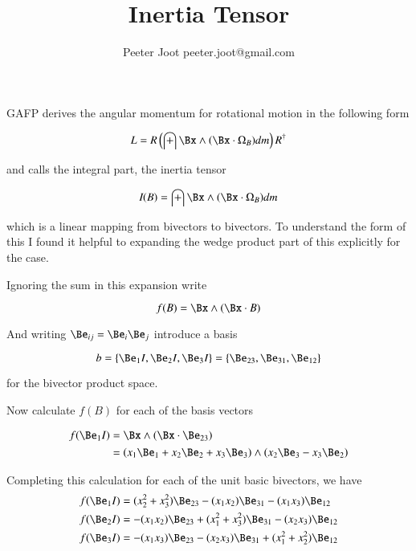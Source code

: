 \documentclass{article}      %
\title{Inertia Tensor} %
\author{Peeter Joot \quad peeter.joot@gmail.com}         %
\begin{document}

\maketitle{}

\section{}

GAFP derives the angular momentum for rotational motion in the following form

\[
L = R \left( \int \Bx \wedge (\Bx \cdot \Omega_B) dm \right) R^\dagger
\]

and calls the integral part, the inertia tensor

\[
\emph{I}(B) = \int \Bx \wedge (\Bx \cdot \Omega_B) dm
\]

which is a linear mapping from bivectors to bivectors.  To understand the
form of this I found it helpful to expanding the wedge product
part of this explicitly for the  case.

Ignoring the sum in this expansion write

\[
f(B) = \Bx \wedge (\Bx \cdot B)
\]

And writing $\Be_{ij} = \Be_i \Be_j$ introduce a basis

\[
b = \{ \Be_1 I, \Be_2 I, \Be_3 I \} = \{ \Be_{23}, \Be_{31}, \Be_{12} \}
\]

for the  bivector product space.

Now calculate $f(B)$ for each of the basis vectors

\begin{align*}
f(\Be_1 I) 
&= \Bx \wedge (\Bx \cdot \Be_{23}) \\
&= ( x_1 \Be_1 + x_2 \Be_2 + x_3 \Be_3) \wedge (x_2 \Be_3 - x_3 \Be_2) \\
\end{align*}

Completing this calculation for each of the unit basic bivectors, we have
\begin{align*}
f(\Be_1 I) &= (x_2^2 + x_3^2) \Be_{23} - (x_1 x_2) \Be_{31} - (x_1 x_3) \Be_{12} \\
f(\Be_2 I) &= -(x_1 x_2) \Be_{23} + (x_1^2 + x_3^2) \Be_{31} - (x_2 x_3) \Be_{12} \\
f(\Be_3 I) &= -(x_1 x_3) \Be_{23} - (x_2 x_3) \Be_{31} + (x_1^2 + x_2^2) \Be_{12} \\
\end{align*}
\end{document}
